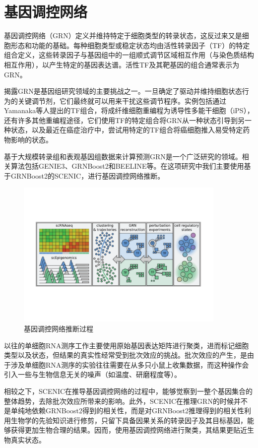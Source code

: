 \section{基因调控网络}
  基因调控网络（GRN）定义并维持特定于细胞类型的转录状态，这反过来又是细胞形态和功能的基础。每种细胞类型或稳定状态均由活性转录因子（TF）的特定组合定义，这些转录因子与基因组中的一组顺式调节区域相互作用（与染色质结构相互作用），以产生特定的基因表达谱\cite{fiers2018mapping,arendt2016origin}。活性TF及其靶基因的组合通常表示为GRN。

  揭露GRN是基因组研究领域的主要挑战之一。一旦确定了驱动并维持细胞状态行为的关键调节剂，它们最终就可以用来干扰这些调节程序。实例包括通过Yamanaka等人\cite{takahashi2006induction}提出的TF组合，将成纤维细胞重编程为诱导性多能干细胞（iPS），还有许多其他重编程途径，它们使用TF的特定组合将GRN从一种状态引导到另一种状态\cite{marro2011direct,ieda2010direct}，以及最近在癌症治疗中，尝试用特定的TF组合将癌细胞推入易受特定药物影响的状态\cite{creixell2012navigating,wouters2017decoding}。

  基于大规模转录组和表观基因组数据来计算预测GRN是一个广泛研究的领域。相关算法包括GENIE3\cite{huynh2010inferring}、GRNBoost2\cite{moerman2019grnboost2}和BEELINE\cite{pratapa2020benchmarking}等。在这项研究中我们主要使用基于GRNBoost2的SCENIC\cite{aibar2017scenic,van2020scalable}，进行基因调控网络推断。

\begin{figure}[!htb]
  \centering
  \includegraphics[width=0.9\textwidth]{figs/scgrn-infer.pdf}
  \caption{基因调控网络推断过程}
  \label{fig:scgrn-infer}
\end{figure}

  以往的单细胞RNA测序工作主要使用原始基因表达矩阵进行聚类，进而标记细胞类型以及状态，但结果的真实性经常受到批次效应的挑战。批次效应的产生，是由于涉及单细胞RNA测序的实验往往需要在从多只小鼠上收集数据，而这种操作会引入一些与生物信息无关的噪声（如温度、研磨程度等）。

  相较之下，SCENIC在推导基因调控网络的过程中，能够觉察到一整个基因集合的整体趋势，去除批次效应所带来的影响。此外，SCENIC在推理GRN的时候并不是单纯地依赖GRNBoost2得到的相关性，而是对GRNBoost2推理得到的相关性利用生物学的先验知识进行修剪，只留下具备因果关系的转录因子及其目标基因，能够获得更加生物合理的结果。因而，使用基因调控网络进行聚类，其结果更贴近生物真实状态。

